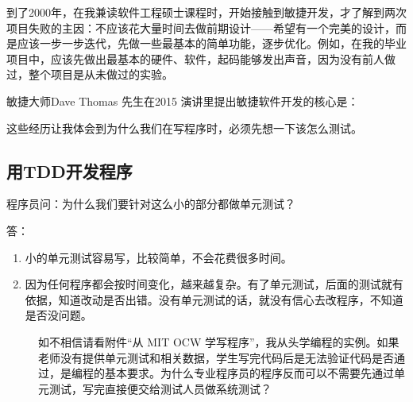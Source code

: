 到了2000年，在我兼读软件工程硕士课程时，开始接触到敏捷开发，才了解到两次项目失败的主因：不应该花大量时间去做前期设计------希望有一个完美的设计，而是应该一步一步迭代，先做一些最基本的简单功能，逐步优化。例如，在我的毕业项目中，应该先做出最基本的硬件、软件，起码能够发出声音，因为没有前人做过，整个项目是从未做过的实验。

敏捷大师Dave Thomas 先生在2015 演讲里提出敏捷软件开发的核心是：



这些经历让我体会到为什么我们在写程序时，必须先想一下该怎么测试。

\hypertarget{ux7528tddux5f00ux53d1ux7a0bux5e8f}{%
\subsection{用TDD开发程序}\label{ux7528tddux5f00ux53d1ux7a0bux5e8f}}

程序员问：为什么我们要针对这么小的部分都做单元测试？

答：

\begin{enumerate}
\tightlist
\item
  小的单元测试容易写，比较简单，不会花费很多时间。
\item
  因为任何程序都会按时间变化，越来越复杂。有了单元测试，后面的测试就有依据，知道改动是否出错。没有单元测试的话，就没有信心去改程序，不知道是否没问题。
\end{enumerate}

\begin{description}
\item[]

如不相信请看附件“从 MIT OCW 学写程序”，我从头学编程的实例。如果老师没有提供单元测试和相关数据，学生写完代码后是无法验证代码是否通过，是编程的基本要求。为什么专业程序员的程序反而可以不需要先通过单元测试，写完直接便交给测试人员做系统测试？
\end{description}


